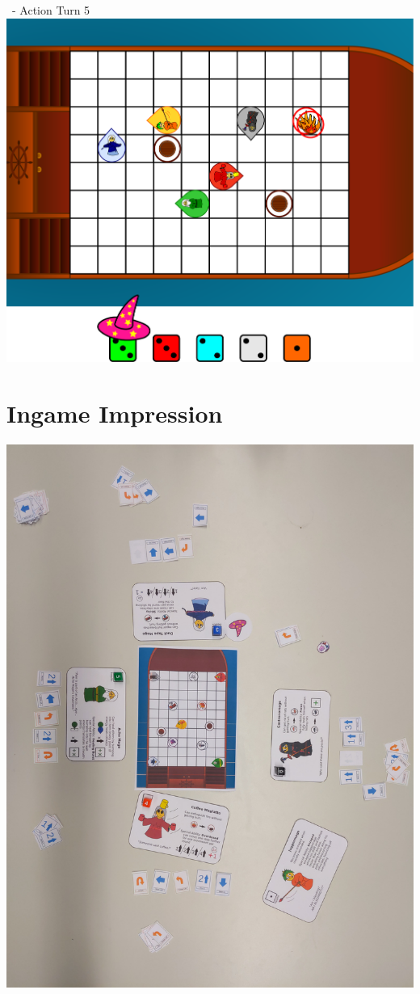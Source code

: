 \documentclass[presentation]{beamer}
\begin{document}
\begin{frame}{\insertsection\ - Action Turn 5}
	\center
	\includegraphics[width=\textheight]{ingame_sketch_5.pdf}
\end{frame}

\section{Ingame Impression}

\begin{frame}{\insertsection}
	\center
	\includegraphics[width=\textheight]{../pics/IMG_20200202_172537.jpg}
\end{frame}
\end{document}
